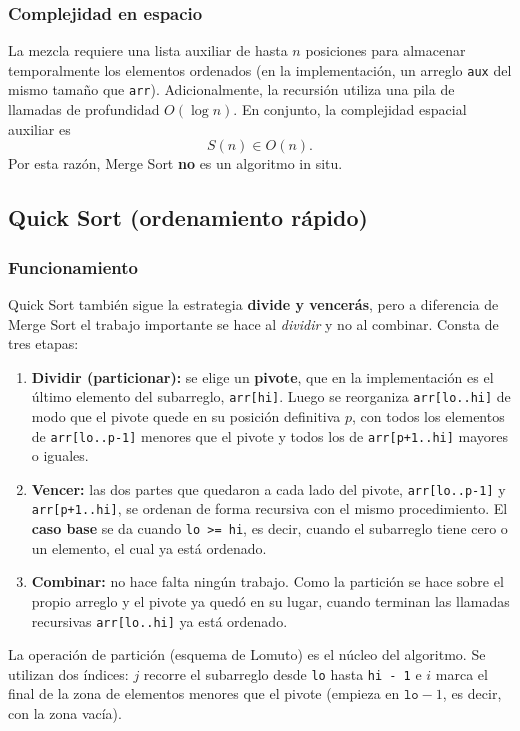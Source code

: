 \documentclass[11pt,letterpaper]{article}
\begin{document}
\subsubsection{Complejidad en espacio}

La mezcla requiere una lista auxiliar de hasta $n$ posiciones para almacenar temporalmente los elementos ordenados (en la implementación, un arreglo \texttt{aux} del mismo tamaño que \texttt{arr}). Adicionalmente, la recursión utiliza una pila de llamadas de profundidad $O(\log n)$. En conjunto, la complejidad espacial auxiliar es
\[
  S(n) \in O(n).
\]
Por esta razón, Merge Sort \textbf{no} es un algoritmo in situ.

\subsection{Quick Sort (ordenamiento rápido)}
\subsubsection{Funcionamiento}

Quick Sort también sigue la estrategia \textbf{divide y vencerás}, pero a diferencia de Merge Sort el trabajo importante se hace al \emph{dividir} y no al combinar. Consta de tres etapas:

\begin{enumerate}
  \item \textbf{Dividir (particionar):} se elige un \textbf{pivote}, que en la implementación es el último elemento del subarreglo, \texttt{arr[hi]}. Luego se reorganiza \texttt{arr[lo..hi]} de modo que el pivote quede en su posición definitiva $p$, con todos los elementos de \texttt{arr[lo..p-1]} menores que el pivote y todos los de \texttt{arr[p+1..hi]} mayores o iguales.
  \item \textbf{Vencer:} las dos partes que quedaron a cada lado del pivote, \texttt{arr[lo..p-1]} y \texttt{arr[p+1..hi]}, se ordenan de forma recursiva con el mismo procedimiento. El \textbf{caso base} se da cuando \texttt{lo >= hi}, es decir, cuando el subarreglo tiene cero o un elemento, el cual ya está ordenado.
  \item \textbf{Combinar:} no hace falta ningún trabajo. Como la partición se hace sobre el propio arreglo y el pivote ya quedó en su lugar, cuando terminan las llamadas recursivas \texttt{arr[lo..hi]} ya está ordenado.
\end{enumerate}

La operación de partición (esquema de Lomuto) es el núcleo del algoritmo. Se utilizan dos índices: $j$ recorre el subarreglo desde \texttt{lo} hasta \texttt{hi - 1} e $i$ marca el final de la zona de elementos menores que el pivote (empieza en $\texttt{lo} - 1$, es decir, con la zona vacía).
\end{document}
